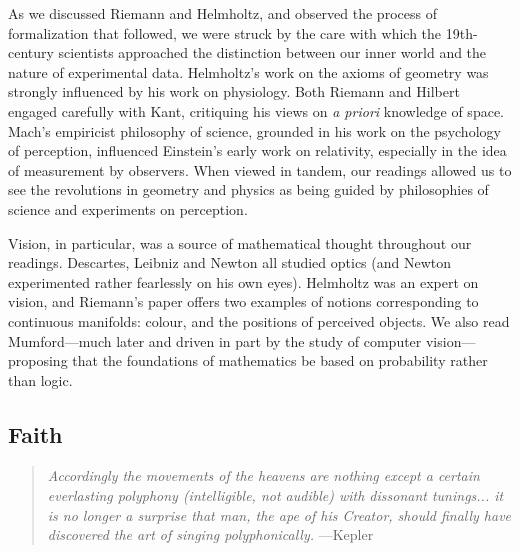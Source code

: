 \documentclass{article}
\begin{document}
As we discussed Riemann and Helmholtz, and observed the process of formalization that followed, we were struck by the care with which the 19th-century scientists approached the distinction between our inner world and the nature of experimental data. Helmholtz’s work on the axioms of geometry was strongly influenced by his work on physiology. Both Riemann and Hilbert engaged carefully with Kant, critiquing his views on {\em a priori} knowledge of space. Mach’s empiricist philosophy of science, grounded in his work on the psychology of perception, influenced Einstein’s early work on relativity, especially in the idea of measurement by observers. When viewed in tandem, our readings allowed us to see the revolutions in geometry and physics as being guided by philosophies of science and experiments on perception.

Vision, in particular, was a source of mathematical thought throughout our readings. Descartes, Leibniz and Newton all studied optics (and Newton experimented rather fearlessly on his own eyes). Helmholtz was an expert on vision, and Riemann’s paper \cite{riemann_hypothesen} offers two examples of notions corresponding to continuous manifolds: colour, and the positions of perceived objects. We also read Mumford---much later and driven in part by the study of computer vision---proposing that the foundations of mathematics be based on probability rather than logic.

 



\subsection{Faith}

\begin{quote}
    {\em Accordingly the movements of the heavens are nothing except a certain
everlasting polyphony (intelligible, not audible) with dissonant tunings...
%
%
%
%
%
it is no longer a surprise that man, the ape of his Creator, should
finally have discovered the art of singing polyphonically.\/} ---Kepler~\cite{kepler_harmonice}
%
\end{quote}

%
\end{document}
